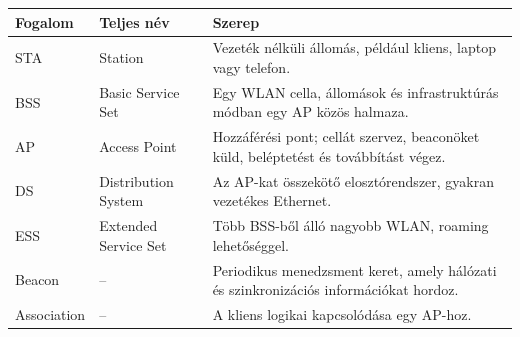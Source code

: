 
\begin{tabularx}{\textwidth}{L{26mm}L{32mm}X}
\toprule
\textbf{Fogalom} & \textbf{Teljes név} & \textbf{Szerep} \\
\midrule
STA & Station & Vezeték nélküli állomás, például kliens, laptop vagy telefon. \\
BSS & Basic Service Set & Egy WLAN cella, állomások és infrastruktúrás módban egy AP közös halmaza. \\
AP & Access Point & Hozzáférési pont; cellát szervez, beaconöket küld, beléptetést és továbbítást végez. \\
DS & Distribution System & Az AP-kat összekötő elosztórendszer, gyakran vezetékes Ethernet. \\
ESS & Extended Service Set & Több BSS-ből álló nagyobb WLAN, roaming lehetőséggel. \\
Beacon & -- & Periodikus menedzsment keret, amely hálózati és szinkronizációs információkat hordoz. \\
Association & -- & A kliens logikai kapcsolódása egy AP-hoz. \\
\bottomrule
\end{tabularx}
